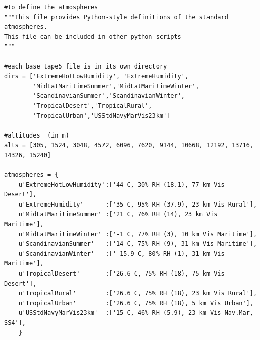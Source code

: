 \documentclass{workpackage}
\begin{document}
\begin{lstlisting}[style=incellstyle,caption={Code Listing in cell 12 \label{lst:autolistingcell12}}]
#to define the atmospheres
"""This file provides Python-style definitions of the standard atmospheres.
This file can be included in other python scripts
"""

#each base tape5 file is in its own directory
dirs = ['ExtremeHotLowHumidity', 'ExtremeHumidity',
        'MidLatMaritimeSummer','MidLatMaritimeWinter',
        'ScandinavianSummer','ScandinavianWinter',
        'TropicalDesert','TropicalRural',
        'TropicalUrban','USStdNavyMarVis23km']
        
#altitudes  (in m)
alts = [305, 1524, 3048, 4572, 6096, 7620, 9144, 10668, 12192, 13716, 14326, 15240]
              
atmospheres = {
    u'ExtremeHotLowHumidity':['44 C, 30% RH (18.1), 77 km Vis Desert'],
    u'ExtremeHumidity'      :['35 C, 95% RH (37.9), 23 km Vis Rural'],
    u'MidLatMaritimeSummer' :['21 C, 76% RH (14), 23 km Vis Maritime'],
    u'MidLatMaritimeWinter' :['-1 C, 77% RH (3), 10 km Vis Maritime'],
    u'ScandinavianSummer'   :['14 C, 75% RH (9), 31 km Vis Maritime'],
    u'ScandinavianWinter'   :['-15.9 C, 80% RH (1), 31 km Vis Maritime'],
    u'TropicalDesert'       :['26.6 C, 75% RH (18), 75 km Vis Desert'], 
    u'TropicalRural'        :['26.6 C, 75% RH (18), 23 km Vis Rural'],
    u'TropicalUrban'        :['26.6 C, 75% RH (18), 5 km Vis Urban'],
    u'USStdNavyMarVis23km'  :['15 C, 46% RH (5.9), 23 km Vis Nav.Mar, SS4'],
    }

\end{lstlisting}
\end{document}
